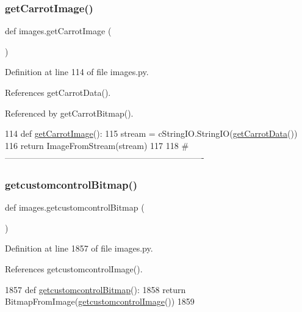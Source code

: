 \subsubsection{\texorpdfstring{get\+Carrot\+Image()}{getCarrotImage()}}
{\footnotesize\ttfamily def images.\+get\+Carrot\+Image (\begin{DoxyParamCaption}{ }\end{DoxyParamCaption})}



Definition at line 114 of file images.\+py.



References get\+Carrot\+Data().



Referenced by get\+Carrot\+Bitmap().


\begin{DoxyCode}
114 \textcolor{keyword}{def }\hyperlink{namespaceimages_ac43eb979d7c688296c5da9ff3d0ae5bc}{getCarrotImage}():
115     stream = cStringIO.StringIO(\hyperlink{namespaceimages_a0c5ea40e98df45c2f313e28639a2b321}{getCarrotData}())
116     \textcolor{keywordflow}{return} ImageFromStream(stream)
117 
118 \textcolor{comment}{#----------------------------------------------------------------------}
\end{DoxyCode}
\mbox{\label{namespaceimages_ac979c6e876c096c46103c6bbcd0792f6}} 
\subsubsection{\texorpdfstring{getcustomcontrol\+Bitmap()}{getcustomcontrolBitmap()}}
{\footnotesize\ttfamily def images.\+getcustomcontrol\+Bitmap (\begin{DoxyParamCaption}{ }\end{DoxyParamCaption})}



Definition at line 1857 of file images.\+py.



References getcustomcontrol\+Image().


\begin{DoxyCode}
1857 \textcolor{keyword}{def }\hyperlink{namespaceimages_ac979c6e876c096c46103c6bbcd0792f6}{getcustomcontrolBitmap}():
1858     \textcolor{keywordflow}{return} BitmapFromImage(\hyperlink{namespaceimages_a25901646c16edc9965eeb7352b5442ac}{getcustomcontrolImage}())
1859 
\end{DoxyCode}
\mbox{\label{namespaceimages_a24e2aa03f0ee46b3385dfd337dbc2d1c}} 
